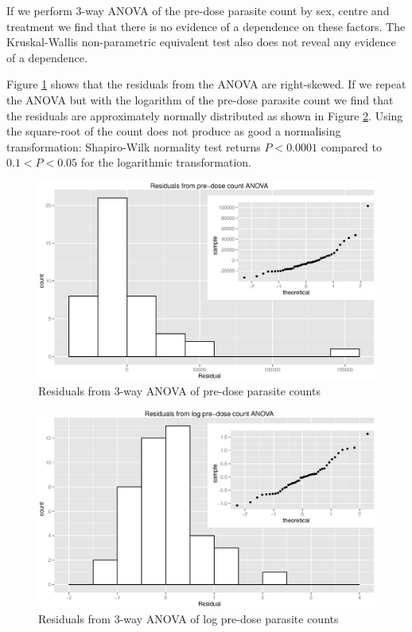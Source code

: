If we perform 3-way ANOVA of the pre-dose parasite count by sex, centre and treatment we find that there is no evidence of a dependence on these factors. The Kruskal-Wallis non-parametric equivalent test also does not reveal any evidence of a dependence.

Figure \ref{aovres} shows that the residuals from the ANOVA are right-skewed. If we repeat the ANOVA but with the logarithm of the pre-dose parasite count we find that the residuals are approximately normally distributed as shown in Figure \ref{logaovres}. Using the square-root of the count does not produce as good a normalising transformation: Shapiro-Wilk normality test returns $P<0.0001$ compared to $0.1<P<0.05$ for the logarithmic transformation. 
\begin{figure}[h]
\begin{center}
\includegraphics[width=6.1in]{aovres.eps}
\end{center}
\caption{Residuals from 3-way ANOVA of pre-dose parasite counts}
\label{aovres}
\end{figure} 
\begin{figure}[h]
\begin{center}
\includegraphics[width=6.1in]{logaovres.eps}
\end{center}
\caption{Residuals from 3-way ANOVA of log pre-dose parasite counts}
\label{logaovres}
\end{figure} 
